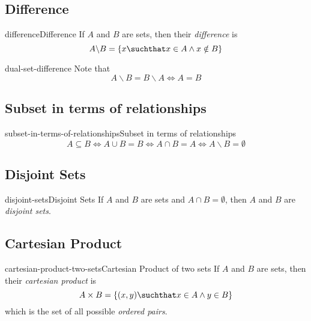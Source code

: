 \documentclass[preview]{standalone}
\begin{document}
\subsection{Difference}

\begin{snippetdefinition}{difference}{Difference}{
    If \(A\) and \(B\) are sets, then their \textit{difference} is
    \[
        A \backslash B = \{x \suchthat x \in A \land x \notin B\}
    \]
}
\end{snippetdefinition}

\begin{snippetcorollary}{dual-set-difference}{}{
    Note that
    \[
        A \backslash B = B \backslash A
        \iff A = B
    \]
}
\end{snippetcorollary}

\subsection{Subset in terms of relationships}

\begin{snippetcorollary}{subset-in-terms-of-relationships}{Subset in terms of relationships}{
    \[
        A \subseteq B
        \iff
        A \cup B = B
        \iff
        A \cap B = A
        \iff
        A \backslash B = \emptyset
    \]
}
\end{snippetcorollary}

\subsection{Disjoint Sets}

\begin{snippetdefinition}{disjoint-sets}{Disjoint Sets}{
    If \(A\) and \(B\) are sets and \(A \cap B = \emptyset \), then \(A\)
    and \(B\) are \textit{disjoint sets}.
}
\end{snippetdefinition}

\subsection{Cartesian Product}

\begin{snippetdefinition}{cartesian-product-two-sets}{Cartesian Product of two sets}{
    If \(A\) and \(B\) are sets, then their \textit{cartesian product} is
    \[
        A\times B = \{(x,y) \suchthat x \in A \land y \in B\}
    \]
    which is the set of all possible \textit{ordered pairs}.
}
\end{snippetdefinition}
\end{document}
